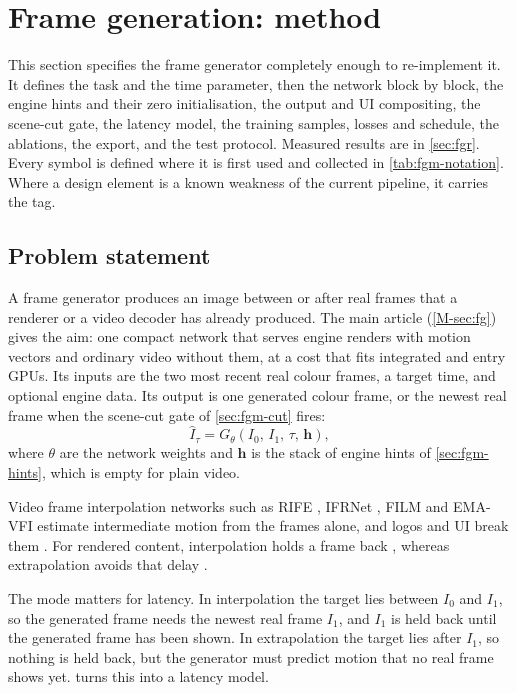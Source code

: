 \section{Frame generation: method}\label{sec:fgm}

This section specifies the frame generator completely enough to re-implement it. It defines the task and the time parameter, then the network block by block, the engine hints and their zero initialisation, the output and UI compositing, the scene-cut gate, the latency model, the training samples, losses and schedule, the ablations, the export, and the test protocol. Measured results are in \cref{sec:fgr}. Every symbol is defined where it is first used and collected in \cref{tab:fgm-notation}. Where a design element is a known weakness of the current pipeline, it carries the \UnderRevision{} tag.

\subsection{Problem statement}\label{sec:fgm-problem}

A frame generator produces an image between or after real frames that a renderer or a video decoder has already produced. The main article (\cref{M-sec:fg}) gives the aim: one compact network that serves engine renders with motion vectors and ordinary video without them, at a cost that fits integrated and entry GPUs. Its inputs are the two most recent real colour frames, a target time, and optional engine data. Its output is one generated colour frame, or the newest real frame when the scene-cut gate of \cref{sec:fgm-cut} fires:
\begin{equation}
\hat I_\tau = G_\theta\!\left(I_0,\,I_1,\,\tau,\,\mathbf h\right),\label{eq:fgm-task}
\end{equation}
where $\theta$ are the network weights and $\mathbf h$ is the stack of engine hints of \cref{sec:fgm-hints}, which is empty for plain video.

Video frame interpolation networks such as RIFE \cite{huang2022rife}, IFRNet \cite{kong2022ifrnet}, FILM \cite{reda2022film} and EMA-VFI \cite{zhang2023emavfi} estimate intermediate motion from the frames alone, and logos and UI break them \cite{lee2023discontinuity}. For rendered content, interpolation holds a frame back \cite{briedis2021rendered}, whereas extrapolation avoids that delay \cite{guo2021extranet,wu2023extrass,he2024stss,wu2024gffe}.

The mode matters for latency. In interpolation the target lies between $I_0$ and $I_1$, so the generated frame needs the newest real frame $I_1$, and $I_1$ is held back until the generated frame has been shown. In extrapolation the target lies after $I_1$, so nothing is held back, but the generator must predict motion that no real frame shows yet.  turns this into a latency model.


